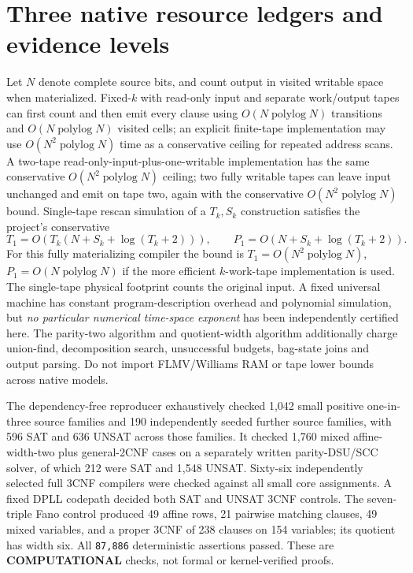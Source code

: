 \documentclass[11pt]{article}
\begin{document}
\section{Three native resource ledgers and evidence levels}
Let $N$ denote complete source bits, and count output in visited writable space when materialized. Fixed-$k$ with read-only input and separate work/output tapes can first count and then emit every clause using $O(N\operatorname{polylog}N)$ transitions and $O(N\operatorname{polylog}N)$ visited cells; an explicit finite-tape implementation may use $O(N^2\operatorname{polylog}N)$ time as a conservative ceiling for repeated address scans. A two-tape read-only-input-plus-one-writable implementation has the same conservative $O(N^2\operatorname{polylog}N)$ ceiling; two fully writable tapes can leave input unchanged and emit on tape two, again with the conservative $O(N^2\operatorname{polylog}N)$ bound. Single-tape rescan simulation of a $T_k,S_k$ construction satisfies the project's conservative
\[
 T_1=O\!\left(T_k(N+S_k+\log(T_k+2))\right),\qquad
 P_1=O\!\left(N+S_k+\log(T_k+2)\right).
\]
For this fully materializing compiler the bound is $T_1=O(N^2\operatorname{polylog}N)$, $P_1=O(N\operatorname{polylog}N)$ if the more efficient $k$-work-tape implementation is used. The single-tape physical footprint counts the original input. A fixed universal machine has constant program-description overhead and polynomial simulation, but \emph{no particular numerical time-space exponent} has been independently certified here. The parity-two algorithm and quotient-width algorithm additionally charge union-find, decomposition search, unsuccessful budgets, bag-state joins and output parsing. Do not import FLMV/Williams RAM or tape lower bounds across native models.

The dependency-free reproducer exhaustively checked 1,042 small positive one-in-three source families and 190 independently seeded further source families, with 596 SAT and 636 UNSAT across those families. It checked 1,760 mixed affine-width-two plus general-2CNF cases on a separately written parity-DSU/SCC solver, of which 212 were SAT and 1,548 UNSAT. Sixty-six independently selected full 3CNF compilers were checked against all small core assignments. A fixed DPLL codepath decided both SAT and UNSAT 3CNF controls. The seven-triple Fano control produced 49 affine rows, 21 pairwise matching clauses, 49 mixed variables, and a proper 3CNF of 238 clauses on 154 variables; its quotient has width six. All \texttt{87,886} deterministic assertions passed. These are \textbf{COMPUTATIONAL} checks, not formal or kernel-verified proofs.
\end{document}
